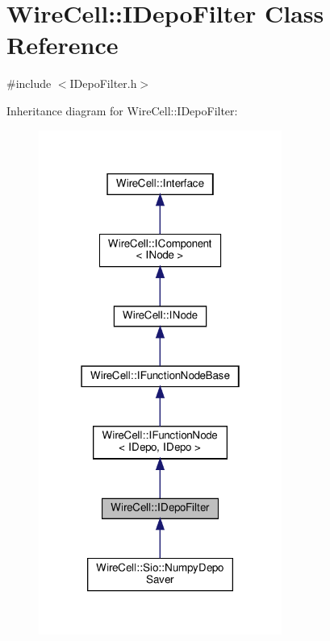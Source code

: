 \hypertarget{class_wire_cell_1_1_i_depo_filter}{}\section{Wire\+Cell\+:\+:I\+Depo\+Filter Class Reference}
\label{class_wire_cell_1_1_i_depo_filter}


{\ttfamily \#include $<$I\+Depo\+Filter.\+h$>$}



Inheritance diagram for Wire\+Cell\+:\+:I\+Depo\+Filter\+:
\nopagebreak
\begin{figure}[H]
\begin{center}
\leavevmode
\includegraphics[width=226pt]{class_wire_cell_1_1_i_depo_filter__inherit__graph}
\end{center}
\end{figure}


